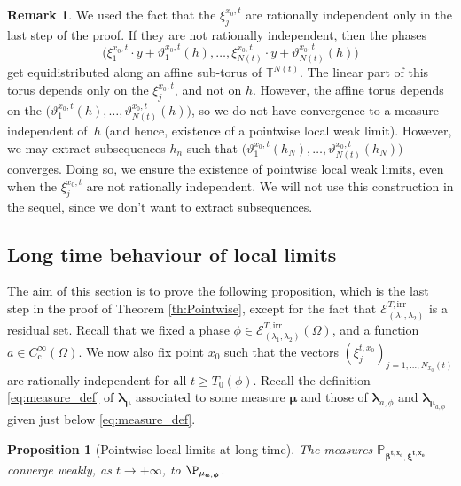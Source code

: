 \documentclass[10pt]{amsart}
\let\mathcal\mathscr
\newcommand{\rc}{\mathrm{c}}
\newcommand{\irr}{\mathrm{irr}}
\theoremstyle{plain}
\newtheorem{proposition}[theorem]{Proposition}
\theoremstyle{definition}
\newtheorem{remark}[theorem]{Remark}
\newcommand{\T}{\mathbb{T}}
\begin{document}
\begin{remark}
We used the fact that the $\xi_j^{x_0,t}$ are rationally independent only in the last step of the proof. If they are not rationally independent, then the phases
\[
\bigl(\xi_1^{x_0,t}\cdot y+ \vartheta_1^{x_0,t}(h), \dots, \xi_{N(t)}^{x_0,t}\cdot y + \vartheta_{N(t)}^{x_0,t}(h) \bigr)
\]
get equidistributed along an affine sub-torus of $\T^{N(t)}$. The linear part of this torus depends only on the $\xi^{x_0,t}_j$, and not on $h$.
However, the affine torus depends on the $\bigl(\vartheta_1^{x_0,t}(h),\dots, \vartheta_{N(t)}^{x_0,t}(h) \bigr)$, so we do not have convergence to a measure independent of~$h$ (and hence, existence of a pointwise local weak limit). However, we may extract subsequences $h_n$ such that $\bigl(\vartheta_1^{x_0,t}(h_N),\dots, \vartheta_{N(t)}^{x_0,t}(h_N) \bigr)$ converges. Doing so, we ensure the existence of pointwise local weak limits, even when the $\xi_j^{x_0,t}$ are not rationally independent. We will not use this construction in the sequel, since we don't want to extract subsequences.
\end{remark}

\subsection{Long time behaviour of local limits}\label{ss:long_time}
The aim of this section is to prove the following proposition, which is the last step in the proof of Theorem \ref{th:Pointwise}, except for the fact that $\mathcal{E}_{(\lambda_1,\lambda_2)}^{T, \irr}$ is a residual set. Recall that we fixed a phase $\phi \in \mathcal{E}^{T,\irr}_{(\lambda_1,\lambda_2)}(\Omega)$, and a function $a\in C_\rc^\infty(\Omega)$. We now also fix point $x_0$ such that the vectors $(\xi_j^{t,x_0})_{j=1,\dots,N_{x_0}(t)}$ are rationally independent for all $t\geq T_0(\phi)$. Recall the definition \eqref{eq:measure_def} of $\boldsymbol{\lambda_\mu}$ associated to some measure $\boldsymbol{\mu}$ and those of $\boldsymbol{\lambda}_{a,\phi}$ and $\boldsymbol{\lambda}_{\boldsymbol{\mu}_{a,\phi}}$ given just below \eqref{eq:measure_def}.

\begin{proposition}[Pointwise local limits at long time]\label{prop:LongTimeLim}
The measures $\mathbb{P}_{\boldsymbol{\beta^{t,x_0}}, \boldsymbol{\xi^{t,x_0}}}$ converge weakly, as $t\to +\infty$, to $\P_{\mu_{\boldsymbol{a},\boldsymbol{\phi}}}$.
\end{proposition}
\end{document}
